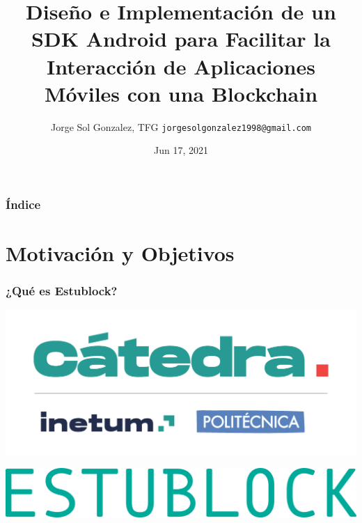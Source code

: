\documentclass[usenames,dvipsnames]{beamer}
\title[SDK Android para Comunicar con Redes Blockchain]{\LARGE Diseño e Implementación de un SDK Android para Facilitar la Interacción de Aplicaciones Móviles con una Blockchain}
\date[Jun 2021]{Jun 17, 2021}
\author[Jorge Sol Gonzalez]{
  Jorge Sol Gonzalez, TFG
  \pdfnewline
  \texttt{jorgesolgonzalez1998@gmail.com}
}
\institute{ETSI Informáticos, Universidad Politécnica de Madrid}
\begin{document}
\begin{frame}
\titlepage
\end{frame}

\begin{frame}
\frametitle{Índice} 
\tableofcontents
\end{frame}





\section{Motivación y Objetivos}

\begin{frame} 
\frametitle{¿Qué es Estublock?} 
  \begin{center}
    \includegraphics[scale=0.50]{graphics/logo_catedra}
  \end{center}
  \begin{center}
    \includegraphics[scale=0.25]{graphics/texto_estublock}
  \end{center}
\end{frame}
\end{document}
